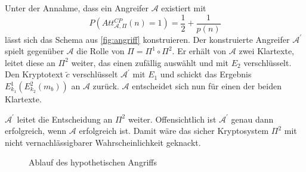 \documentclass{../crypto}
\begin{document}
\FloatBarrier

Unter der Annahme, dass ein Angreifer $\mathcal{A}$ existiert mit 
\begin{equation*}
   P\left(Att_{\mathcal{A},\Pi}^{CP}(n) = 1\right) = \frac{1}{2} +
   \frac{1}{p(n)}
\end{equation*}
lässt sich das Schema aus \autoref{fig:angriff} konstruieren.
Der konstruierte Angreifer $\mathcal{A}^\prime$ spielt gegenüber $\mathcal{A}$
die Rolle von $\Pi = \Pi^1 \circ \Pi^2$. Er erhält von $\mathcal{A}$ zwei
Klartexte, leitet diese an $\Pi^2$ weiter, das einen zufällig auswählt und mit
$E_2$ verschlüsselt. Den Kryptotext $\widetilde{c}$ verschlüsselt
$\mathcal{A}^\prime$ mit $E_1$ und schickt das Ergebnis $E_{k_1}^1(E_{k_2}^2(m_b))$ an $\mathcal{A}$ zurück.
$\mathcal{A}$ entscheidet sich nun für einen der beiden Klartexte.

$\mathcal{A}^\prime$ leitet die Entscheidung an $\Pi^2$ weiter.
Offensichtlich ist $\mathcal{A}^\prime$ genau dann erfolgreich, wenn
$\mathcal{A}$ erfolgreich ist. Damit wäre das sicher Kryptosystem $\Pi^2$ mit
nicht vernachlässigbarer Wahrscheinlichkeit geknackt.

\begin{figure}
\begin{center}
\end{center}
\caption{Ablauf des hypothetischen Angriffs}
\label{fig:angriff}
\end{figure}
\end{document}
